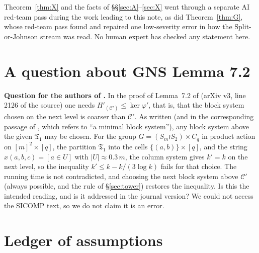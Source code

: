 \documentclass[11pt]{article}
\theoremstyle{definition}
\theoremstyle{remark}
\newcommand{\C}{\mathcal C}
\newcommand{\fT}{\mathfrak T}
\begin{document}
Theorem~\ref{thm:X} and the facts of \S\S\ref{sec:A}--\ref{sec:X} went through a separate AI red-team pass during the work leading to this note, as did Theorem~\ref{thm:G}, whose red-team pass found and repaired one low-severity error in how the Split-or-Johnson stream was read. No human expert has checked any statement here.

\section{A question about GNS Lemma 7.2}\label{sec:question}

\textbf{Question for the authors of \cite{GNS}.} In the proof of Lemma~7.2 of \cite{GNS} (arXiv v3, line 2126 of the source) one needs $H'_{(\C')}\le\ker\varphi'$, that is, that the block system chosen on the next level is coarser than $\C'$. As written (and in the corresponding passage of \cite{Neu20}, which refers to ``a minimal block system''), any block system above the given $\fT_1$ may be chosen. For the group $G=(S_m\wr S_2)\times C_q$ in product action on $[m]^2\times[q]$, the partition $\fT_1$ into the cells $\{(a,b)\}\times[q]$, and the string $x(a,b,c)=[a\in U]$ with $|U|\approx 0.3\,m$, the column system gives $k'=k$ on the next level, so the inequality $k'\le k-k/(3\log k)$ fails for that choice. The running time is not contradicted, and choosing the next block system above $\C'$ (always possible, and the rule of \S\ref{sec:tower}) restores the inequality. Is this the intended reading, and is it addressed in the journal version? We could not access the SICOMP text, so we do not claim it is an error.

\section{Ledger of assumptions}\label{sec:ledger}
\end{document}
